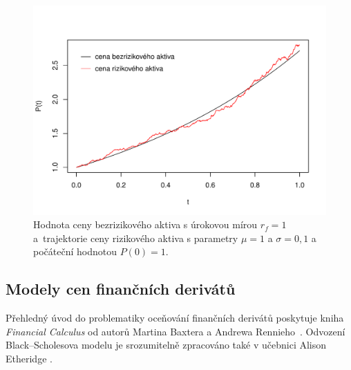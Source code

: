 \documentclass[a4paper,12pt]{report}
\theoremstyle{definition} \newtheorem{definice}[veta]{Definice}
\theoremstyle{remark}
\begin{document}
\begin{figure}[!htbp]
  \centering 
	\includegraphics[width=13.5cm, clip, trim= 0 15 25 50]{IMG/GWP_RFA_v5.pdf}
  \caption{Hodnota ceny bezrizikového aktiva s úrokovou mírou $r_f=1$ a~trajektorie ceny rizikového aktiva s parametry $\mu=1$ a  $\sigma=0,1$ a počáteční hodnotou $P(0)=1$.}  \label{asset_model_graf}
\end{figure}

\subsection{Modely cen finančních derivátů}\label{derivaty_kap}
Přehledný úvod do problematiky oceňování finančních derivátů poskytuje kniha \textit{Financial Calculus} od autorů Martina Baxtera a Andrewa Rennieho~\cite{baxter1996financial}.
Odvození Black–Scholesova modelu je srozumitelně zpracováno také v učebnici Alison Etheridge \cite{etheridge2002course}.
\end{document}
